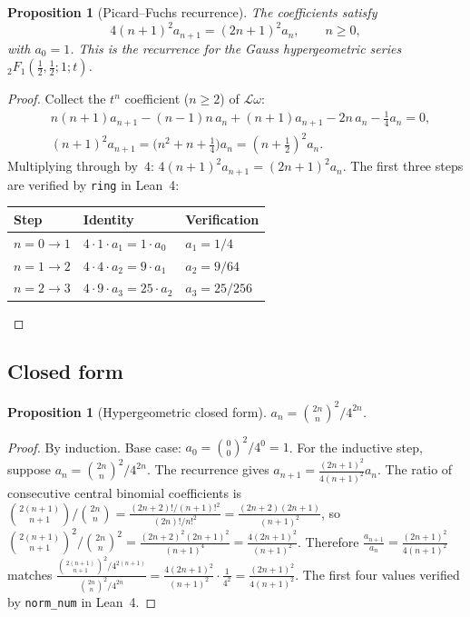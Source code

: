 \documentclass[11pt]{article}
\theoremstyle{plain}
\newtheorem{proposition}[theorem]{Proposition}
\theoremstyle{definition}
\theoremstyle{remark}
\newcommand{\calL}{\mathcal{L}}
\begin{document}
\begin{proposition}[Picard--Fuchs recurrence]\label{prop:recurrence}
The coefficients satisfy
\[
  4(n+1)^2 a_{n+1} = (2n+1)^2 a_n, \qquad n \geq 0,
\]
with $a_0 = 1$.  This is the recurrence for the Gauss hypergeometric
series ${}_2F_1(\tfrac{1}{2}, \tfrac{1}{2}; 1; t)$.
\end{proposition}
\begin{proof}
Collect the $t^n$ coefficient ($n \geq 2$) of $\calL\omega$:
\begin{align*}
  &n(n+1)a_{n+1} - (n-1)n\,a_n
    + (n+1)a_{n+1} - 2n\,a_n - \tfrac{1}{4}a_n = 0, \\
  &(n+1)^2 a_{n+1} = \bigl(n^2 + n + \tfrac{1}{4}\bigr)a_n
    = (n + \tfrac{1}{2})^2 a_n.
\end{align*}
Multiplying through by~$4$: $4(n+1)^2 a_{n+1} = (2n+1)^2 a_n$.
The first three steps are verified by \texttt{ring} in Lean~4:
\begin{center}
\begin{tabular}{lll}
\toprule
\textbf{Step} & \textbf{Identity} & \textbf{Verification} \\
\midrule
$n = 0 \to 1$ & $4 \cdot 1 \cdot a_1 = 1 \cdot a_0$ & $a_1 = 1/4$ \\
$n = 1 \to 2$ & $4 \cdot 4 \cdot a_2 = 9 \cdot a_1$ & $a_2 = 9/64$ \\
$n = 2 \to 3$ & $4 \cdot 9 \cdot a_3 = 25 \cdot a_2$ & $a_3 = 25/256$ \\
\bottomrule
\end{tabular}
\end{center}
\end{proof}

\subsection{Closed form}

\begin{proposition}[Hypergeometric closed form]\label{prop:closed}
$a_n = \binom{2n}{n}^2 / 4^{2n}$.
\end{proposition}
\begin{proof}
By induction.  Base case: $a_0 = \binom{0}{0}^2/4^0 = 1$.
For the inductive step, suppose $a_n = \binom{2n}{n}^2/4^{2n}$.
The recurrence gives $a_{n+1} = \frac{(2n+1)^2}{4(n+1)^2} a_n$.
The ratio of consecutive central binomial coefficients is
$\binom{2(n+1)}{n+1}/\binom{2n}{n} = \frac{(2n+2)!/(n+1)!^2}{(2n)!/n!^2}
= \frac{(2n+2)(2n+1)}{(n+1)^2}$,
so $\binom{2(n+1)}{n+1}^2/\binom{2n}{n}^2
= \frac{(2n+2)^2(2n+1)^2}{(n+1)^4} = \frac{4(2n+1)^2}{(n+1)^2}$.
Therefore $\frac{a_{n+1}}{a_n} = \frac{(2n+1)^2}{4(n+1)^2}$
matches $\frac{\binom{2(n+1)}{n+1}^2/4^{2(n+1)}}{\binom{2n}{n}^2/4^{2n}}
= \frac{4(2n+1)^2}{(n+1)^2} \cdot \frac{1}{4^2}
= \frac{(2n+1)^2}{4(n+1)^2}$.
The first four values verified by \texttt{norm\_num} in Lean~4.
\end{proof}
\end{document}
